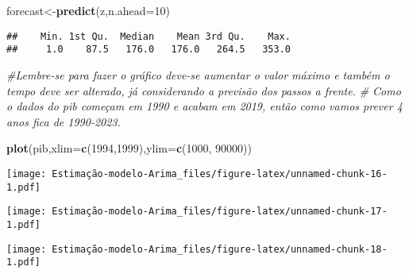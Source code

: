 \documentclass[]{article}
\newenvironment{Shaded}{\begin{snugshade}}{\end{snugshade}}
\newcommand{\CommentTok}[1]{\textcolor[rgb]{0.56,0.35,0.01}{\textit{#1}}}
\newcommand{\DataTypeTok}[1]{\textcolor[rgb]{0.13,0.29,0.53}{#1}}
\newcommand{\DecValTok}[1]{\textcolor[rgb]{0.00,0.00,0.81}{#1}}
\newcommand{\KeywordTok}[1]{\textcolor[rgb]{0.13,0.29,0.53}{\textbf{#1}}}
\newcommand{\NormalTok}[1]{#1}
\newcommand{\OperatorTok}[1]{\textcolor[rgb]{0.81,0.36,0.00}{\textbf{#1}}}
\newcommand{\StringTok}[1]{\textcolor[rgb]{0.31,0.60,0.02}{#1}}
\begin{document}
\begin{Shaded}
\begin{Highlighting}[]
\NormalTok{forecast<-}\KeywordTok{predict}\NormalTok{(z,}\DataTypeTok{n.ahead=}\DecValTok{10}\NormalTok{)}
\end{Highlighting}
\end{Shaded}

\begin{Shaded}
\end{Shaded}

\begin{verbatim}
##    Min. 1st Qu.  Median    Mean 3rd Qu.    Max. 
##     1.0    87.5   176.0   176.0   264.5   353.0
\end{verbatim}

\begin{Shaded}
\begin{Highlighting}[]
\CommentTok{#Lembre-se para fazer o gráfico deve-se aumentar o valor máximo e também o tempo deve ser alterado, já considerando a previsão dos passos a frente.}
  \CommentTok{# Como o dados do pib começam em 1990 e acabam em 2019, então como vamos prever 4 anos fica de 1990-2023.}

\KeywordTok{plot}\NormalTok{(pib,}\DataTypeTok{xlim=}\KeywordTok{c}\NormalTok{(}\DecValTok{1994}\NormalTok{,}\DecValTok{1999}\NormalTok{),}\DataTypeTok{ylim=}\KeywordTok{c}\NormalTok{(}\DecValTok{1000}\NormalTok{, }\DecValTok{90000}\NormalTok{))}
\end{Highlighting}
\end{Shaded}

\texttt{[image: Estimação-modelo-Arima\_files/figure-latex/unnamed-chunk-16-1.pdf]}

\begin{Shaded}
\end{Shaded}

\texttt{[image: Estimação-modelo-Arima\_files/figure-latex/unnamed-chunk-17-1.pdf]}

\begin{Shaded}
\end{Shaded}

\texttt{[image: Estimação-modelo-Arima\_files/figure-latex/unnamed-chunk-18-1.pdf]}
\end{document}
